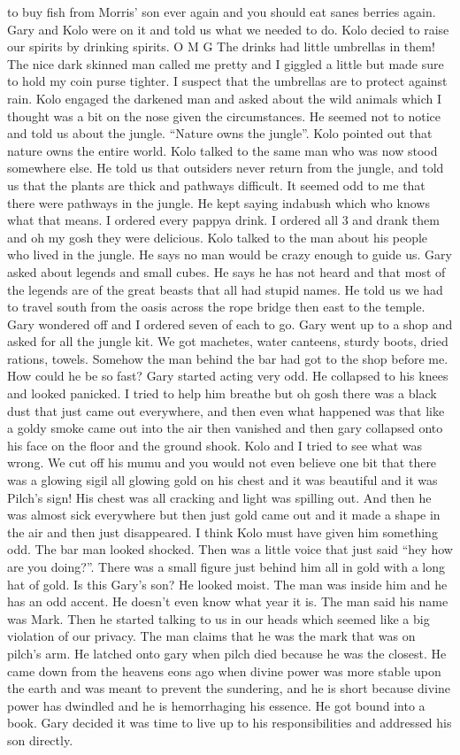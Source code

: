 to buy fish from Morris’ son ever again and you should eat sanes berries again. Gary and Kolo were on it and told us what we needed to do. Kolo decied to raise our spirits by drinking spirits. O M G The drinks had little umbrellas in them! The nice dark skinned man called me pretty and I giggled a little but made sure to hold my coin purse tighter. I suspect that the umbrellas are to protect against rain. Kolo engaged the darkened man and asked about the wild animals which I thought was a bit on the nose given the circumstances. He seemed not to notice and told us about the jungle. “Nature owns the jungle”. Kolo pointed out that nature owns the entire world. Kolo talked to the same man who was now stood somewhere else. He told us that outsiders never return from the jungle, and told us that the plants are thick and pathways difficult. It seemed odd to me that there were pathways in the jungle. He kept saying indabush which who knows what that means. I ordered every pappya drink. I ordered all 3 and drank them and oh my gosh they were delicious. Kolo talked to the man about his people who lived in the jungle. He says no man would be crazy enough to guide us. Gary asked about legends and small cubes. He says he has not heard and that most of the legends are of the great beasts that all had stupid names. He told us we had to travel south from the oasis across the rope bridge then east to the temple. Gary wondered off and I ordered seven of each to go. Gary went up to a shop and asked for all the jungle kit. We got machetes, water canteens, sturdy boots, dried rations, towels. Somehow the man behind the bar had got to the shop before me. How could he be so fast? Gary started acting very odd. He collapsed to his knees and looked panicked. I tried to help him breathe but oh gosh there was a black dust that just came out everywhere, and then even what happened was that like a goldy smoke came out into the air then vanished and then gary collapsed onto his face on the floor and the ground shook. Kolo and I tried to see what was wrong. We cut off his mumu and you would not even believe one bit that there was a glowing sigil all glowing gold on his chest and it was beautiful and it was Pilch’s sign! His chest was all cracking and light was spilling out. And then he was almost sick everywhere but then just gold came out and it made a shape in the air and then just disappeared. I think Kolo must have given him something odd. The bar man looked shocked. Then was a little voice that just said “hey how are you doing?”. There was a small figure just behind him all in gold with a long hat of gold. Is this Gary’s son? He looked moist. The man was inside him and he has an odd accent. He doesn’t even know what year it is. The man said his name was Mark. Then he started talking to us in our heads which seemed like a big violation of our privacy. The man claims that he was the mark that was on pilch’s arm. He latched onto gary when pilch died because he was the closest. He came down from the heavens eons ago when divine power was more stable upon the earth and was meant to prevent the sundering, and he is short because divine power has dwindled and he is hemorrhaging his essence. He got bound into a book. Gary decided it was time to live up to his responsibilities and addressed his son directly. 